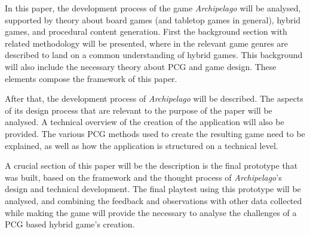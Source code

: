 
In this paper, the development process of the game \textit{Archipelago} will be analysed, supported by theory about board games (and tabletop games in general), hybrid games, and procedural content generation. First the background section with related methodology will be presented, where in the relevant game genres are described to land on a common understanding of hybrid games. This background will also include the necessary theory about PCG and game design. These elements compose the framework of this paper.

After that, the development process of \textit{Archipelago} will be described. The aspects of its design process that are relevant to the purpose of the paper will be analysed. A technical overview of the creation of the application will also be provided. The various PCG methods used to create the resulting game need to be explained, as well as how the application is structured on a technical level. 

A crucial section of this paper will be the description is the final prototype that was built, based on the framework and the thought process of \textit{Archipelago}'s design and technical development. The final playtest using this prototype will be analysed, and combining the feedback and observations with other data collected while making the game will provide the necessary to analyse the challenges of a PCG based hybrid game's creation.

